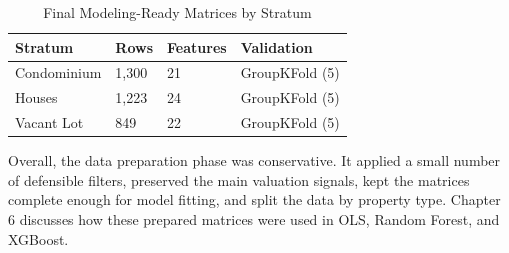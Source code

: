 \begin{table}[H]
\caption{Final Modeling-Ready Matrices by Stratum}
\label{tab:chapter5-final-matrix}
\begin{center}
\begin{tabular}{L{0.26\textwidth} L{0.14\textwidth} L{0.18\textwidth} L{0.20\textwidth}}
\toprule
Stratum & Rows & Features & Validation \\
\midrule
Condominium & 1{,}300 & 21 & GroupKFold (5) \\
Houses & 1{,}223 & 24 & GroupKFold (5) \\
Vacant Lot & 849 & 22 & GroupKFold (5) \\
\bottomrule
\end{tabular}
\end{center}
\end{table}

Overall, the data preparation phase was conservative. It applied a small number of defensible filters, preserved the main valuation signals, kept the matrices complete enough for model fitting, and split the data by property type. Chapter 6 discusses how these prepared matrices were used in OLS, Random Forest, and XGBoost.
